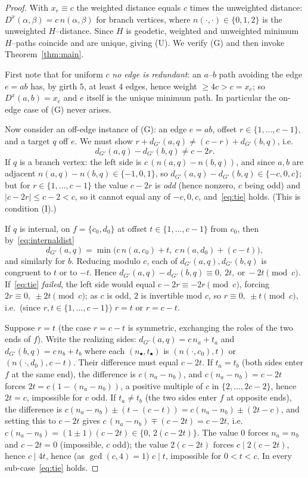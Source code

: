 \documentclass{amsart}
\theoremstyle{definition}
\begin{document}
\begin{proof}
With $x_e\equiv c$ the weighted distance equals $c$ times the unweighted
distance: $D^x(\alpha,\beta)=c\,n(\alpha,\beta)$ for branch vertices, where
$n(\cdot,\cdot)\in\{0,1,2\}$ is the unweighted $H$--distance. Since $H$ is
geodetic, weighted and unweighted minimum $H$--paths coincide and are unique,
giving (U). We verify (G) and then invoke Theorem~\ref{thm:main}.

First note that for uniform $c$ \emph{no edge is redundant}: an $a$--$b$ path
avoiding the edge $e=ab$ has, by girth $5$, at least $4$ edges, hence weight
$\ge 4c>c=x_e$; so $D^x(a,b)=x_e$ and $e$ itself is the unique minimum path.
In particular the on-edge case of (G) never arises.

Now consider an off-edge instance of (G): an edge $e=ab$, offset
$r\in\{1,\dots,c-1\}$, and a target $q$ off $e$. We must show
$r+d_{G'}(a,q)\neq(c-r)+d_{G'}(b,q)$, i.e.\
\begin{equation}\label{eq:tie}
 d_{G'}(a,q)-d_{G'}(b,q)\neq c-2r .
\end{equation}
If $q$ is a branch vertex: the left side is $c\,(n(a,q)-n(b,q))$, and since $a,b$
are adjacent $n(a,q)-n(b,q)\in\{-1,0,1\}$, so $d_{G'}(a,q)-d_{G'}(b,q)\in
\{-c,0,c\}$; but for $r\in\{1,\dots,c-1\}$ the value $c-2r$ is \emph{odd}
(hence nonzero, $c$ being odd) and $|c-2r|\le c-2<c$, so it cannot equal any of
$-c,0,c$, and~\eqref{eq:tie} holds. (This is condition (I).)

If $q$ is internal, on $f=\{c_0,d_0\}$ at offset $t\in\{1,\dots,c-1\}$ from
$c_0$, then by~\eqref{eq:internaldist}
\[
 d_{G'}(a,q)=\min\big(c\,n(a,c_0)+t,\ c\,n(a,d_0)+(c-t)\big),
\]
and similarly for $b$. Reducing modulo $c$, each of $d_{G'}(a,q),d_{G'}(b,q)$ is
congruent to $t$ or to $-t$. Hence
$d_{G'}(a,q)-d_{G'}(b,q)\equiv 0,\ 2t,\ \text{or}\ -2t \pmod c$. If~\eqref{eq:tie}
\emph{failed}, the left side would equal $c-2r\equiv -2r\pmod c$, forcing
$2r\equiv 0,\ \pm 2t\pmod c$; as $c$ is odd, $2$ is invertible mod $c$, so
$r\equiv 0,\ \pm t\pmod c$, i.e.\ (since $r,t\in\{1,\dots,c-1\}$) $r=t$ or
$r=c-t$.

Suppose $r=t$ (the case $r=c-t$ is symmetric, exchanging the roles of the two
ends of $f$). Write the realizing sides: $d_{G'}(a,q)=c\,n_a+t_a$ and
$d_{G'}(b,q)=c\,n_b+t_b$ where each $(n_\bullet,t_\bullet)$ is $(n(\cdot,c_0),t)$
or $(n(\cdot,d_0),c-t)$. Their difference must equal $c-2t$. If $t_a=t_b$ (both
sides enter $f$ at the same end), the difference is $c(n_a-n_b)$, and
$c(n_a-n_b)=c-2t$ forces $2t=c(1-(n_a-n_b))$, a positive multiple of $c$ in
$\{2,\dots,2c-2\}$, hence $2t=c$, impossible for $c$ odd. If $t_a\neq t_b$ (the
two sides enter $f$ at opposite ends), the difference is
$c(n_a-n_b)\pm(t-(c-t))=c(n_a-n_b)\pm(2t-c)$, and setting this to $c-2t$ gives
$c\,(n_a-n_b)\mp(c-2t)=c-2t$, i.e.\ $c(n_a-n_b)=(1\pm1)(c-2t)\in\{0,\,2(c-2t)\}$.
The value $0$ forces $n_a=n_b$ and $c-2t=0$ (impossible, $c$ odd); the value
$2(c-2t)$ forces $c\mid 2(c-2t)$, hence $c\mid 4t$, hence (as $\gcd(c,4)=1$)
$c\mid t$, impossible for $0<t<c$. In every sub-case~\eqref{eq:tie} holds.


\end{proof}
\end{document}
